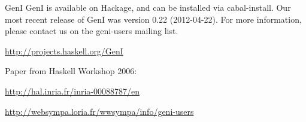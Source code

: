 \begin{hcarentry}{GenI}
GenI is available on Hackage, and can be installed via cabal-install.
Our most recent release of GenI was version 0.22 (2012-04-22). For more
information, please contact us on the geni-users mailing list.

\FurtherReading
\begin{compactitem}
\item \url{http://projects.haskell.org/GenI}
\item Paper from Haskell Workshop 2006:

\url{http://hal.inria.fr/inria-00088787/en}
\item \url{http://websympa.loria.fr/wwsympa/info/geni-users}
\end{compactitem}
\end{hcarentry}
